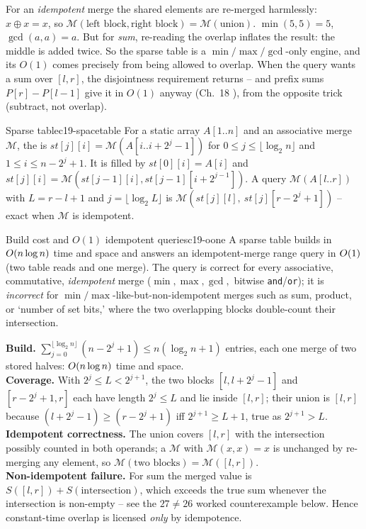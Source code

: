 For an \emph{idempotent} merge the shared elements are re-merged harmlessly: \(x\oplus x=x\), so \( \mathcal{M}(\text{left block},\text{right block})=\mathcal{M}(\text{union})\). \(\min(5,5)=5\), \(\gcd(a,a)=a\). But for \emph{sum}, re-reading the overlap inflates the result: the middle is added twice. So the sparse table is a \(\min/\max/\gcd\)-only engine, and its \(O(1)\) comes precisely from being allowed to overlap. When the query wants a sum over \([l,r]\), the disjointness requirement returns -- and prefix sums \(P[r]-P[l-1]\) give it in \(O(1)\) anyway (Ch.~18 ), from the opposite trick (subtract, not overlap).

\begin{definition}{Sparse table}{c19-spacetable}
For a static array \(A[1..n]\) and an associative merge \(\mathcal{M}\), the  is \(\mathit{st}[j][i]=\mathcal{M}(A[i..i+2^j-1])\) for \(0\le j\le\lfloor\log_2 n\rfloor\) and \(1\le i\le n-2^j+1\). It is filled by \(\mathit{st}[0][i]=A[i]\) and \(\mathit{st}[j][i]=\mathcal{M}(\mathit{st}[j-1][i],\mathit{st}[j-1][i+2^{j-1}])\). A query \(\mathcal{M}(A[l..r])\) with \(L=r-l+1\) and \(j=\lfloor\log_2 L\rfloor\) is \(\mathcal{M}(\mathit{st}[j][l],\ \mathit{st}[j][r-2^j+1])\) -- exact when \(\mathcal{M}\) is idempotent.
\end{definition}

\begin{theorem}{Build cost and \(O(1)\) idempotent queries}{c19-oone}
A sparse table builds in \(O(n\log n)\) time and space and answers an idempotent-merge range query in \(O(1)\) (two table reads and one merge). The query is correct for every associative, commutative, \emph{idempotent} merge (\(\min,\max,\gcd,\) bitwise \texttt{and}/\texttt{or}); it is \emph{incorrect} for \(\min/\max\)-like-but-non-idempotent merges such as sum, product, or `number of set bits,' where the two overlapping blocks double-count their intersection.
\end{theorem}
\begin{proofbox}
\textbf{Build.} \(\sum_{j=0}^{\lfloor\log_2 n\rfloor}(n-2^j+1)\le n(\log_2 n+1)\) entries, each one merge of two stored halves: \(O(n\log n)\) time and space.\\
\textbf{Coverage.} With \(2^j\le L<2^{j+1}\), the two blocks \([l,l+2^j-1]\) and \([r-2^j+1,r]\) each have length \(2^j\le L\) and lie inside \([l,r]\); their union is \([l,r]\) because \((l+2^j-1)\ge(r-2^j+1)\) iff \(2^{j+1}\ge L+1\), true as \(2^{j+1}>L\).\\
\textbf{Idempotent correctness.} The union covers \([l,r]\) with the intersection possibly counted in both operands; a \(\mathcal{M}\) with \(\mathcal{M}(x,x)=x\) is unchanged by re-merging any element, so \(\mathcal{M}(\text{two blocks})=\mathcal{M}([l,r])\).\\
\textbf{Non-idempotent failure.} For sum the merged value is \(S([l,r])+S(\text{intersection})\), which exceeds the true sum whenever the intersection is non-empty -- see the \(27\ne26\) worked counterexample below. Hence constant-time overlap is licensed \emph{only} by idempotence.
\end{proofbox}

